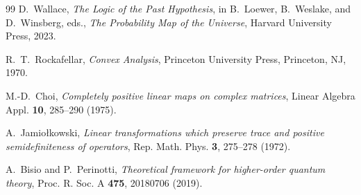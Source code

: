 \documentclass[11pt,a4paper]{article}
\theoremstyle{definition}
\theoremstyle{plain}
\theoremstyle{remark}
\begin{document}
\begin{thebibliography}{99}
D.~Wallace,
\emph{The Logic of the Past Hypothesis}, in B.~Loewer, B.~Weslake, and D.~Winsberg, eds.,
\emph{The Probability Map of the Universe}, Harvard University Press, 2023.

R.~T.~Rockafellar,
\emph{Convex Analysis},
Princeton University Press, Princeton, NJ, 1970.

M.-D.~Choi,
\emph{Completely positive linear maps on complex matrices},
Linear Algebra Appl. \textbf{10}, 285--290 (1975).

A.~Jamio\l{}kowski,
\emph{Linear transformations which preserve trace and positive semidefiniteness of operators},
Rep. Math. Phys. \textbf{3}, 275--278 (1972).

A.~Bisio and P.~Perinotti,
\emph{Theoretical framework for higher-order quantum theory},
Proc. R. Soc. A \textbf{475}, 20180706 (2019).

\end{thebibliography}
\end{document}
